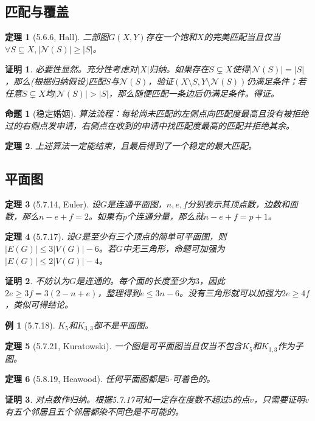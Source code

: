 \documentclass[landscape, a4paper]{article}
\theoremstyle{compact}
\newtheorem{theorem}{定理}
\newtheorem{example}{例}
\newtheorem{proposition}{命题}
\newtheorem{Proof}{证明}
\def\le{\leqslant}
\def\ge{\geqslant}
\begin{document}
\begin{multicols}{3}
\subsection{匹配与覆盖}
\begin{theorem}[5.6.6, Hall]
	二部图$G(X, Y)$存在一个饱和$X$的完美匹配当且仅当$\forall S \subseteq X, |\mathcal N(S)| \ge |S|$。
\end{theorem}
\begin{Proof}
	必要性显然。充分性考虑对$|X|$归纳。如果存在$S\subsetneq X$使得$|\mathcal N(S)| = |S|$，那么(根据归纳假设)匹配$S$与$\mathcal N(S)$，验证$(X \setminus S, Y \setminus \mathcal N(S))$仍满足条件；若任意$S \subsetneq X$均$|\mathcal N(S)| > |S|$，那么随便匹配一条边后仍满足条件。得证。
\end{Proof}
\begin{proposition}[稳定婚姻]
	算法流程：每轮尚未匹配的左侧点向匹配度最高且没有被拒绝过的右侧点发申请，右侧点在收到的申请中找匹配度最高的匹配并拒绝其余。
\end{proposition}
\begin{theorem}
	上述算法一定能结束，且最后得到了一个稳定的最大匹配。
\end{theorem}
\subsection{平面图}
\begin{theorem}[5.7.14, Euler]
	设$G$是连通平面图，$n, e, f$分别表示其顶点数，边数和面数，那么$n - e + f = 2$。如果有$p$个连通分量，那么就$n - e + f = p + 1$。
\end{theorem}
\begin{theorem}[5.7.17]
	设$G$是至少有三个顶点的简单可平面图，则$|E(G)| \le 3|V(G)| - 6$。若$G$中无三角形，命题可加强为$|E(G)| \le 2|V(G)| - 4$。
\end{theorem}
\begin{Proof}
	不妨认为$G$是连通的。每个面的长度至少为$3$，因此$2e \ge 3f = 3(2 - n + e)$，整理得到$e \le 3n - 6$。没有三角形就可以加强为$2e \ge 4f$，类似可得结论。
\end{Proof}
\begin{example}[5.7.18]
	$K_5$和$K_{3, 3}$都不是平面图。
\end{example}
\begin{theorem}[5.7.21, Kuratowski]
	一个图是可平面图当且仅当不包含$K_5$和$K_{3, 3}$作为子图。
\end{theorem}
\begin{theorem}[5.8.19, Heawood]
	任何平面图都是$5$-可着色的。
\end{theorem}
\begin{Proof}
	对点数作归纳。根据5.7.17可知一定存在度数不超过$5$的点$v$，只需要证明$v$有五个邻居且五个邻居都染不同色是不可能的。
	

\end{Proof}
\end{multicols}
\end{document}
